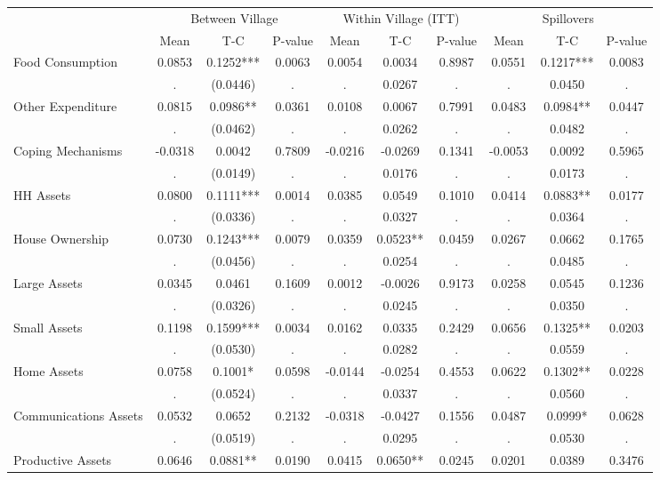 \begin{tabular}{l*{9}{c}}\hline&\multicolumn{3}{c}{Between Village}&\multicolumn{3}{c}{Within Village (ITT)}&\multicolumn{3}{c}{Spillovers} \\ \cmidrule(r){2-4}\cmidrule(l){5-7}\cmidrule(l){8-10} & {Mean} & {T-C} & {P-value} & {Mean} & {T-C} & {P-value} & {Mean} & {T-C} & {P-value} \\ \midrule  
Food Consumption & 0.0853 & 0.1252*** & 0.0063 & 0.0054 & 0.0034 & 0.8987 & 0.0551 & 0.1217*** & 0.0083 \\
  & . & (0.0446) & . & . & 0.0267 & . & . & 0.0450 & . \\
Other Expenditure & 0.0815 & 0.0986** & 0.0361 & 0.0108 & 0.0067 & 0.7991 & 0.0483 & 0.0984** & 0.0447 \\
  & . & (0.0462) & . & . & 0.0262 & . & . & 0.0482 & . \\
Coping Mechanisms & -0.0318 & 0.0042 & 0.7809 & -0.0216 & -0.0269 & 0.1341 & -0.0053 & 0.0092 & 0.5965 \\
  & . & (0.0149) & . & . & 0.0176 & . & . & 0.0173 & . \\
HH Assets & 0.0800 & 0.1111*** & 0.0014 & 0.0385 & 0.0549 & 0.1010 & 0.0414 & 0.0883** & 0.0177 \\
  & . & (0.0336) & . & . & 0.0327 & . & . & 0.0364 & . \\
House Ownership & 0.0730 & 0.1243*** & 0.0079 & 0.0359 & 0.0523** & 0.0459 & 0.0267 & 0.0662 & 0.1765 \\
  & . & (0.0456) & . & . & 0.0254 & . & . & 0.0485 & . \\
Large Assets & 0.0345 & 0.0461 & 0.1609 & 0.0012 & -0.0026 & 0.9173 & 0.0258 & 0.0545 & 0.1236 \\
  & . & (0.0326) & . & . & 0.0245 & . & . & 0.0350 & . \\
Small Assets & 0.1198 & 0.1599*** & 0.0034 & 0.0162 & 0.0335 & 0.2429 & 0.0656 & 0.1325** & 0.0203 \\
  & . & (0.0530) & . & . & 0.0282 & . & . & 0.0559 & . \\
Home Assets & 0.0758 & 0.1001* & 0.0598 & -0.0144 & -0.0254 & 0.4553 & 0.0622 & 0.1302** & 0.0228 \\
  & . & (0.0524) & . & . & 0.0337 & . & . & 0.0560 & . \\
Communications Assets & 0.0532 & 0.0652 & 0.2132 & -0.0318 & -0.0427 & 0.1556 & 0.0487 & 0.0999* & 0.0628 \\
  & . & (0.0519) & . & . & 0.0295 & . & . & 0.0530 & . \\
Productive Assets & 0.0646 & 0.0881** & 0.0190 & 0.0415 & 0.0650** & 0.0245 & 0.0201 & 0.0389 & 0.3476 \\

\end{tabular}

